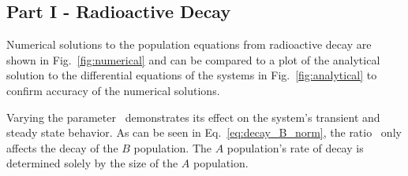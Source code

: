 \documentclass[pra,twocolumn,showpacs,amsmath,amssymb]{revtex4-1}
\begin{document}
\subsection{Part I - Radioactive Decay}\label{sec:decay}

Numerical solutions to the population equations from radioactive decay
 are shown in Fig.~\ref{fig:numerical} and can be compared to
a plot of the analytical solution to the differential equations of the systems
in Fig.~\ref{fig:analytical} to confirm accuracy of the numerical solutions.

Varying the parameter \trel~demonstrates its effect on the
system's transient and steady state behavior.
As can be seen in Eq.~\ref{eq:decay_B_norm}, the ratio
 \trel~only affects the decay of the $B$ population. The $A$
 population's rate of decay is determined solely by the size of the $A$ population.
\end{document}
